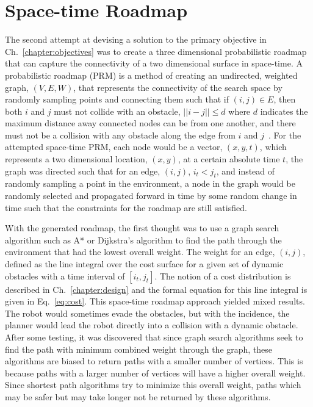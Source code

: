 \section{Space-time Roadmap}

\label{sec:stroadmap}

The second attempt at devising a solution to the primary objective in
Ch.~\ref{chapter:objectives} was to create a three dimensional probabilistic
roadmap that can capture the connectivity of a two dimensional surface in
space-time. A probabilistic roadmap (PRM) is a method of creating an
undirected, weighted graph, $(V, E, W)$, that represents the connectivity of
the search space by randomly sampling points and connecting them such that if
$(i, j) \in E$, then both $i$ and $j$ must not collide with an obstacle, $||i -
j|| \leq d$ where $d$ indicates the maximum distance away connected nodes can
be from one another, and there must not be a collision with any obstacle along
the edge from $i$ and $j$~\cite{prm}. For the attempted space-time PRM, each
node would be a vector, $(x, y, t)$, which represents a two dimensional
location, $(x, y)$, at a certain absolute time $t$, the graph was directed such
that for an edge, $(i, j)$, $i_t < j_t$, and instead of randomly sampling a
point in the environment, a node in the graph would be randomly selected and
propagated forward in time by some random change in time such that the
constraints for the roadmap are still satisfied.


With the generated roadmap, the first thought was to use a graph search
algorithm such as A* or Dijkstra's algorithm to find the path through the
environment that had the lowest overall weight. The weight for an edge, $(i,
j)$, defined as the line integral over the cost surface for a given set of
dynamic obstacles with a time interval of $[i_t, j_t]$. The notion of a cost
distribution is described in Ch.~\ref{chapter:design} and the formal equation
for this line integral is given in Eq.~\ref{eq:cost}. This space-time roadmap
approach yielded mixed results. The robot would sometimes evade the obstacles,
but with the incidence, the planner would lead the robot directly into a
collision with a dynamic obstacle. After some testing, it was discovered that
since graph search algorithms seek to find the path with minimum combined
weight through the graph, these algorithms are biased to return paths with a
smaller number of vertices. This is because paths with a larger number of
vertices will have a higher overall weight. Since shortest path algorithms try
to minimize this overall weight, paths which may be safer but may take longer
not be returned by these algorithms.

